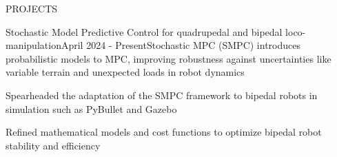\documentclass{resume} %
\begin{document}
\begin{rSection}{PROJECTS}
	\begin{rProjExpDetails}{Stochastic Model Predictive Control for quadrupedal and bipedal loco-manipulation}{}{April 2024 - Present}{Stochastic MPC (SMPC) introduces probabilistic models to MPC, improving robustness against uncertainties like variable terrain and unexpected loads in robot dynamics}{}{}
		\item Spearheaded the adaptation of the SMPC framework to bipedal robots in simulation such as PyBullet and Gazebo
		\item Refined mathematical models and cost functions to optimize bipedal robot stability and efficiency %
	\end{rProjExpDetails}


\end{rSection}
\end{document}
